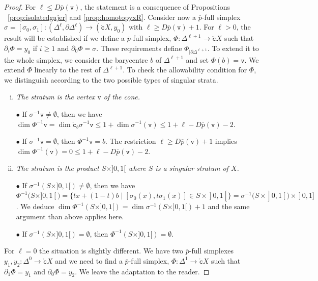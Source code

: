 \documentclass[a4paper,10pt,english,reqno]{amsart}
\theoremstyle{plain}
\theoremstyle{definition}
\theoremstyle{remark}
\numberwithin{equation}{section}
\def\ov{\overline}
\def\tc{{\mathtt c}}
\def\tv{{\mathtt v}}
\def\rc{{\mathring{\tc}}}
\renewcommand\1{\hbox{\ding{192}}}
\renewcommand\2{\hbox{\ding{193}}}
\newcommand\3{\hbox{\ding{194}}}
\newcommand\4{\hbox{\ding{195}}}
\begin{document}
\begin{proof} 
For $\ell \leq D\ov{p}(\tv)$, the statement is a  consequence of  Propositions ~\ref{prop:isolatedgajer} 
and \ref{prop:homotopyxR}.
%
%
Consider now a  $\ov{p}$-full  simplex
$\sigma=[\sigma_{0},\sigma_{1}]\colon (\Delta^\ell,\partial \Delta^\ell)\to (\rc X,y_{0})$
with $\ell\geq D\ov{p}(\tv) +1 $. 
For $\ell>0$, the result will be established if we define a $\ov{p}$-full simplex,
$\Phi\colon \Delta^{\ell+1}\to \rc X$ such that
$\partial_{i}\Phi=y_{0}$ if $i\geq 1$ and $\partial_{0}\Phi=\sigma$.
%
These requirements define $\Phi_{|\partial \Delta^{\ell+1}}$. 
To extend it to the whole simplex, we consider
the barycentre $b$ of $\Delta^{\ell+1}$ and  set $\Phi(b)=\tv$.
We extend $\Phi$ linearly
to the rest of $\Delta^{\ell+1}$. 
To check the allowability condition for $\Phi$,
%
we distinguish according to the two possible types of singular strata.
%
\begin{enumerate}[(i)]
\item \emph{The  stratum is the vertex $\tv$ of the cone.}

$\bullet$ If $ \sigma^{-1}\tv \neq\emptyset$, then we have
$ \dim \Phi^{-1}\tv=\dim \rc_{b}\sigma^{-1}  \tv \leq 1+  \dim\sigma^{-1}(\tv ) \leq 1+ \ell- D\ov{p}(\tv)-2$.

$\bullet$  If $\sigma^{-1}\tv =\emptyset$, then $\Phi^{-1}\tv =b $.  %
The restriction $\ell\geq D\ov{p}(\tv)+1$ implies
%
$ \dim \Phi^{-1}(\tv)=0\leq1+   \ell -D\ov{p}(\tv) - 2$.%
%
\item \emph{The stratum is the product $S\times ]0,1[$ where $S$ is a singular stratum of $X$.}
 
 $\bullet$ If $\sigma^{-1}(S\times ]0,1[)\neq\emptyset$, then we have\\
$ \Phi^{-1}(S\times ]0,1[)=
\{tx+(1-t)b\mid 
[\sigma_{0}(x),t\sigma_{1}(x)]
\in S\times ]0,1[\}  =\sigma^{-1}(S \times ]0,1[) \times ]0,1]$.
We deduce $\dim\Phi^{-1}(S\times ]0,1[)=\dim\sigma^{-1}(S\times ]0,1[)+1$
and the same argument than above applies here.

$\bullet$ If $\sigma^{-1}(S\times ]0,1[)=\emptyset$, then
 $\Phi^{-1}(S\times ]0,1[)=\emptyset$.
%
\end{enumerate}
%
For $\ell=0$ the situation is slightly different. We have two $\ov p$-full simplexes $y_1,y_2 \colon \Delta^0 \to \rc X$ and we need to find a  
$\ov{p}$-full simplex,
$\Phi\colon \Delta^{1}\to \rc X$ such that
$\partial_1\Phi=y_1$ and $\partial_{0}\Phi=y_2$.
We leave the adaptation to the reader.
%
\end{proof}
\end{document}
